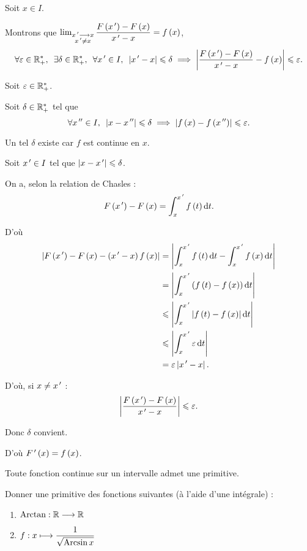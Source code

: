 \begin{dem}
Soit \(x\in I\).

Montrons que \(\lim_{\substack{x^{\,\prime}\longrightarrow x \\ x^{\,\prime}\not=x}}\dfrac{F\left(x^{\,\prime}\right)-F\left(x\right)}{x^{\,\prime}-x}=f\left(x\right)\), \cad \[\quantifs{\forall\epsilon\in\Rps;\exists\delta\in\Rps;\forall x\prim\in I}\abs{x\prim-x}\leq\delta\imp\abs{\dfrac{F\paren{x\prim}-F\paren{x}}{x\prim-x}-f\paren{x}}\leq\epsilon.\]

Soit \(\varepsilon\in\mathbb{R}_+^*\).

Soit \(\delta\in\mathbb{R}_+^*\) tel que \[\quantifs{\forall x\seconde\in I}\abs{x-x\seconde}\leq\delta\imp\abs{f\paren{x}-f\paren{x\seconde}}\leq\epsilon.\]

Un tel \(\delta\) existe car \(f\) est continue en \(x\).

Soit \(x^{\,\prime}\in I\) tel que \(\left\lvert x-x^{\,\prime}\right\rvert\leqslant\delta\).

On a, selon la relation de Chasles : \[F\paren{x\prim}-F\paren{x}=\int_x^{x\prim}f\paren{t}\odif{t}.\]

D'où \[\begin{aligned}
\abs{F\paren{x\prim}-F\paren{x}-\paren{x\prim-x}f\paren{x}}&=\abs{\int_x^{x\prim}f\paren{t}\odif{t}-\int_x^{x\prim}f\paren{x}\odif{t}} \\
&=\abs{\int_x^{x\prim}\paren{f\paren{t}-f\paren{x}}\odif{t}} \\
&\leq\abs{\int_x^{x\prim}\abs{f\paren{t}-f\paren{x}}\odif{t}} \\
&\leq\abs{\int_x^{x\prim}\epsilon\odif{t}} \\
&=\epsilon\abs{x\prim-x}.
\end{aligned}\]

D'où, si \(x\not=x^{\,\prime}\) : \[\left\lvert\dfrac{F\left(x^{\,\prime}\right)-F\left(x\right)}{x^{\,\prime}-x}\right\rvert\leqslant\varepsilon.\]

Donc \(\delta\) convient.

D'où \(F^{\,\prime}\left(x\right)=f\left(x\right)\).
\end{dem}

\begin{cor}
Toute fonction continue sur un intervalle admet une primitive.
\end{cor}

\begin{exo}
Donner une primitive des fonctions suivantes (à l'aide d'une intégrale) :

\begin{enumerate}
\item \(\operatorname{Arctan}:\mathbb{R}\longrightarrow\mathbb{R}\) \\

\item \(f:x\longmapsto\dfrac{1}{\sqrt{\operatorname{Arcsin} x}}\)
\end{enumerate}
\end{exo}

